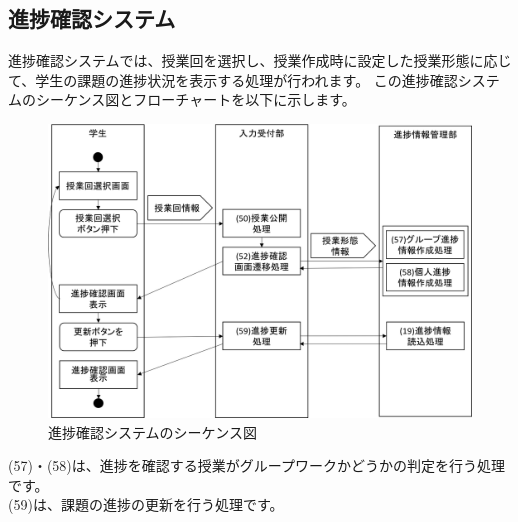 \clearpage



\subsection{進捗確認システム}
進捗確認システムでは、授業回を選択し、授業作成時に設定した授業形態に応じて、学生の課題の進捗状況を表示する処理が行われます。
この進捗確認システムのシーケンス図とフローチャートを以下に示します。

\begin{figure}[htbp]
  \begin{center}
    \includegraphics[width=1\linewidth,clip]{./img/seq14.png}
    \caption{進捗確認システムのシーケンス図}\label{fig:seq14}
  \end{center}
\end{figure}

(57)・(58)は、進捗を確認する授業がグループワークかどうかの判定を行う処理です。\\
(59)は、課題の進捗の更新を行う処理です。

